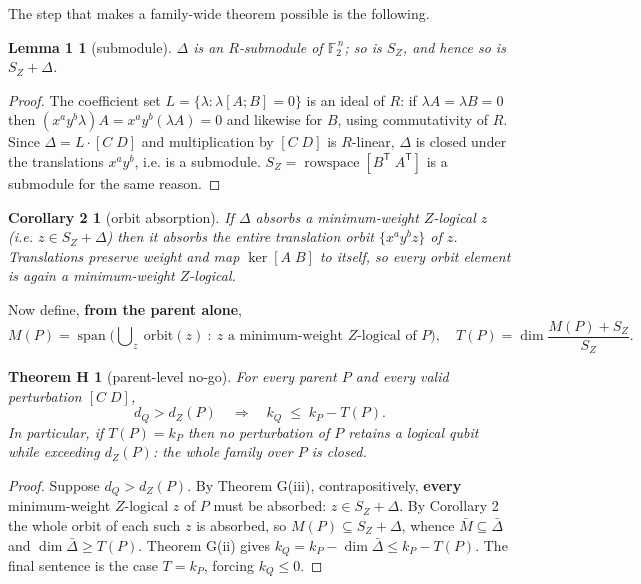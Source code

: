 \documentclass[11pt]{article}
\theoremstyle{plain}
\newtheorem*{lemmaone}{Lemma 1}
\newtheorem*{cortwo}{Corollary 2}
\newtheorem*{theoremH}{Theorem H}
\theoremstyle{remark}
\begin{document}
The step that makes a family-wide theorem possible is the following.

\begin{lemmaone}[submodule]
$\Delta$ is an $R$-submodule of $\mathbb{F}_2^{\,n}$; so is
$S_Z$, and hence so is $S_Z+\Delta$.
\end{lemmaone}

\begin{proof}
The coefficient set $L=\{\lambda : \lambda[A;B]=0\}$ is an ideal of $R$: if
$\lambda A=\lambda B=0$ then $(x^ay^b\lambda)A = x^ay^b(\lambda A)=0$ and likewise for
$B$, using commutativity of $R$. Since $\Delta=L\cdot[C\;D]$ and multiplication by
$[C\;D]$ is $R$-linear, $\Delta$ is closed under the translations $x^ay^b$, i.e. is a
submodule. $S_Z=\operatorname{rowspace}[B^{\mathsf T}\;A^{\mathsf T}]$ is a submodule for
the same reason.
\end{proof}

\begin{cortwo}[orbit absorption]
If $\Delta$ absorbs a minimum-weight $Z$-logical $z$
(i.e. $z\in S_Z+\Delta$) then it absorbs the entire translation orbit
$\{x^ay^b z\}$ of $z$. Translations preserve weight and map $\ker[A\;B]$ to itself, so
every orbit element is again a minimum-weight $Z$-logical.
\end{cortwo}

Now define, \textbf{from the parent alone},
\[
M(P)=\operatorname{span}\Big(\bigcup\nolimits_{z}\ \mathrm{orbit}(z)\ :\ z \text{ a minimum-weight } Z\text{-logical of } P\Big),\quad T(P)=\dim\frac{M(P)+S_Z}{S_Z}.
\]

\begin{theoremH}[parent-level no-go]
For every parent $P$ and every valid perturbation
$[C\;D]$,
\[
d_Q > d_Z(P)\quad\Longrightarrow\quad k_Q \;\le\; k_P - T(P).
\]
In particular, if $T(P)=k_P$ then no perturbation of $P$ retains a logical qubit while
exceeding $d_Z(P)$: the whole family over $P$ is closed.
\end{theoremH}

\begin{proof}
Suppose $d_Q>d_Z(P)$. By Theorem G(iii), contrapositively, \textbf{every}
minimum-weight $Z$-logical $z$ of $P$ must be absorbed: $z\in S_Z+\Delta$. By
Corollary 2 the whole orbit of each such $z$ is absorbed, so
$M(P)\subseteq S_Z+\Delta$, whence $\bar M\subseteq\bar\Delta$ and
$\dim\bar\Delta\ge T(P)$. Theorem G(ii) gives
$k_Q=k_P-\dim\bar\Delta\le k_P-T(P)$. The final sentence is the case $T=k_P$, forcing
$k_Q\le 0$.
\end{proof}
\end{document}
